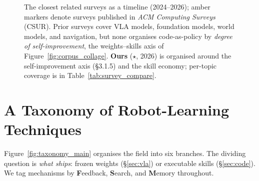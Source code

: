\PassOptionsToPackage{svgnames,dvipsnames}{xcolor} \documentclass[acmsmall,screen,nonacm]{acmart}
\begin{document}
\begin{figure}[t]
{}
\caption{The closest related surveys as a timeline (2024--2026);
\textcolor{secD!55!black}{amber} markers denote surveys published in \emph{ACM Computing
Surveys} (CSUR). Prior surveys cover VLA models, foundation models, world models, and navigation,
but none organises code-as-policy by \emph{degree of self-improvement}, the weights--skills axis of
Figure~\ref{fig:corpus_collage}. \textbf{Ours}
($\star$, 2026) is organised around the self-improvement axis (\S3.1.5) and the skill economy;
per-topic coverage is in Table~\ref{tab:survey_compare}.}
\label{fig:surveys}
\end{figure}
 \FloatBarrier
 \section{A Taxonomy of Robot-Learning Techniques}
\label{sec:taxonomy}

Figure~\ref{fig:taxonomy_main} organises the field into six branches. The dividing
question is \emph{what ships}: frozen weights (\S\ref{sec:vla}) or executable skills
(\S\ref{sec:code}). We tag mechanisms by \textbf{F}eedback, \textbf{S}earch, and
\textbf{M}emory throughout.
\end{document}
